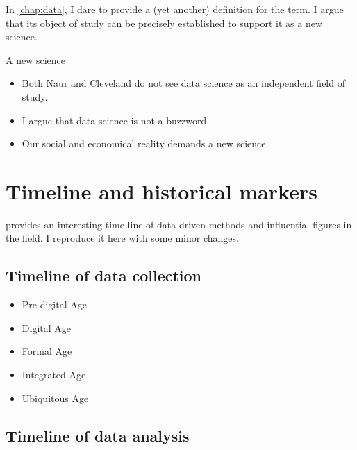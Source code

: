 In \cref{chap:data}, I dare to provide a (yet another) definition for the term.  I
argue that its object of study can be precisely established to support it as a new
science.

\begin{mainbox}{A new science}
  \begin{itemize}
    \item Both Naur and Cleveland do not see data science as an independent field of study.
    \item I argue that data science is not a buzzword.
    \item Our social and economical reality demands a new science.
  \end{itemize}
\end{mainbox}

\section{Timeline and historical markers}

\textcite{Kelleher2018} provides an interesting time line of data-driven methods and
influential figures in the field.  I reproduce it here with some minor changes.

\subsection{Timeline of data collection}

\begin{itemize}
  \item Pre-digital Age
  \item Digital Age
  \item Formal Age
  \item Integrated Age
  \item Ubiquitous Age
\end{itemize}

\subsection{Timeline of data analysis}

